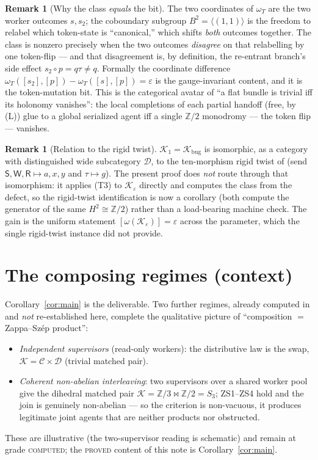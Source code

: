 \documentclass[11pt]{article}
\theoremstyle{definition}
\newtheorem{remark}[theorem]{Remark}
\newcommand{\C}{\mathcal{C}}
\newcommand{\D}{\mathcal{D}}
\newcommand{\K}{\mathcal{K}}
\newcommand{\Sup}{\mathsf{S}}
\newcommand{\Wk}{\mathsf{W}}
\newcommand{\Rt}{\mathsf{R}}
\begin{document}
\begin{remark}[Why the class \emph{equals} the bit]
The two coordinates of $\omega_T$ are the two worker outcomes $s,s_2$; the
coboundary subgroup $B^2=\langle(1,1)\rangle$ is the freedom to relabel which
token-state is ``canonical,'' which shifts \emph{both} outcomes together. The class
is nonzero precisely when the two outcomes \emph{disagree} on that relabelling by
one token-flip --- and that disagreement is, by definition, the re-entrant branch's
side effect $s_2\circ p=q\tau\neq q$. Formally the coordinate difference
$\omega_T([s_2],[p])-\omega_T([s],[p])=\varepsilon$ is the gauge-invariant content,
and it is the token-mutation bit. This is the categorical avatar of ``a flat bundle
is trivial iff its holonomy vanishes'': the local completions of each partial handoff
(free, by (L)) glue to a global serialized agent iff a single $\mathbb Z/2$ monodromy
--- the token flip --- vanishes.
\end{remark}

\begin{remark}[Relation to the rigid twist]
$\K_1=\K_{\mathrm{bug}}$ is isomorphic, as a category with distinguished wide
subcategory $\D$, to the ten-morphism rigid twist of \cite{gobstr} (send
$\Sup,\Wk,\Rt\mapsto a,x,y$ and $\tau\mapsto g$). The present proof does \emph{not}
route through that isomorphism: it applies (T3) to $\K_\varepsilon$ directly and
computes the class from the defect, so the rigid-twist identification is now a
corollary (both compute the generator of the same $H^2\cong\mathbb Z/2$) rather than
a load-bearing machine check. The gain is the uniform statement
$[\omega(\K_\varepsilon)]=\varepsilon$ across the parameter, which the single
rigid-twist instance did not provide.
\end{remark}

\section{The composing regimes (context)}\label{sec:context}

Corollary~\ref{cor:main} is the deliverable. Two further regimes, already computed
in \cite{instantiation} and \emph{not} re-established here, complete the qualitative
picture of ``composition $=$ Zappa--Sz\'ep product'':
\begin{itemize}
\item \emph{Independent supervisors} (read-only workers): the distributive law is
the swap, $\K=\C\times\D$ (trivial matched pair).
\item \emph{Coherent non-abelian interleaving}: two supervisors over a shared worker
pool give the dihedral matched pair $\K=\mathbb Z/3\bowtie\mathbb Z/2=S_3$; ZS1--ZS4
hold and the join is genuinely non-abelian --- so the criterion is non-vacuous, it
produces legitimate joint agents that are neither products nor obstructed.
\end{itemize}
These are illustrative (the two-supervisor reading is schematic) and remain at grade
\textsc{computed}; the \textsc{proved} content of this note is
Corollary~\ref{cor:main}.
\end{document}
